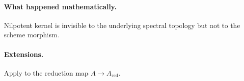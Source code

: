 \paragraph{What happened mathematically.}
Nilpotent kernel is invisible to the underlying spectral topology but not to the scheme morphism.

\paragraph{Extensions.}
Apply to the reduction map $A\to A_{\mathrm{red}}$.
\fi
